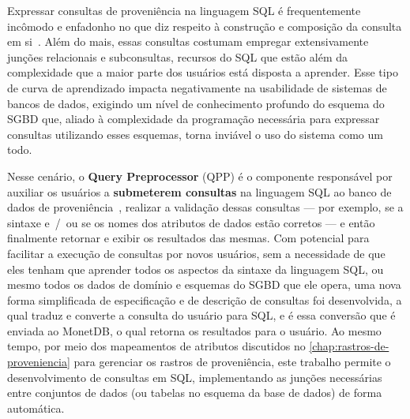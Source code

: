 Expressar consultas de proveniência na linguagem SQL é frequentemente incômodo e enfadonho no que diz respeito à construção e composição da consulta em si~\cite{gadelha2012mtcprov}. Além do mais, essas consultas costumam empregar extensivamente junções relacionais e subconsultas, recursos do SQL que estão além da complexidade que a maior parte dos usuários está disposta a aprender. Esse tipo de curva de aprendizado impacta negativamente na usabilidade de sistemas de bancos de dados, exigindo um nível de conhecimento profundo do esquema do SGBD que, aliado à complexidade da programação necessária para expressar consultas utilizando esses esquemas, torna inviável o uso do sistema como um todo.

Nesse cenário, o \textbf{Query Preprocessor} (QPP) é o componente responsável por auxiliar os usuários a \textbf{submeterem consultas} na linguagem SQL ao banco de dados de proveniência~\cite{silva2016situ}, realizar a validação dessas consultas --- por exemplo, se a sintaxe e~/~ou se os nomes dos atributos de dados estão corretos --- e então finalmente retornar e exibir os resultados das mesmas. Com potencial para facilitar a execução de consultas por novos usuários, sem a necessidade de que eles tenham que aprender todos os aspectos da sintaxe da linguagem SQL, ou mesmo todos os dados de domínio e esquemas do SGBD que ele opera, uma nova forma simplificada de especificação e de descrição de consultas foi desenvolvida, a qual traduz e converte a consulta do usuário para SQL, e é essa conversão que é enviada ao MonetDB, o qual retorna os resultados para o usuário. Ao mesmo tempo, por meio dos mapeamentos de atributos discutidos no \autoref{chap:rastros-de-proveniencia} para gerenciar os rastros de proveniência, este trabalho permite o desenvolvimento de consultas em SQL, implementando as junções necessárias entre conjuntos de dados (ou tabelas no esquema da base de dados) de forma automática.


